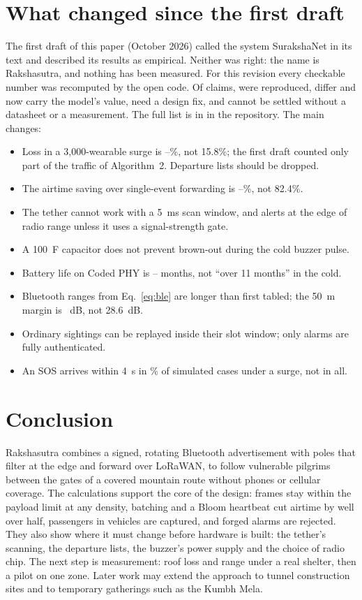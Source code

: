 \documentclass[11pt,a4paper]{article}
\begin{document}
\section{What changed since the first draft}\label{sec:audit}
The first draft of this paper (October 2026) called the system SurakshaNet in its text and described its results as
empirical. Neither was right: the name is Rakshasutra, and nothing has been measured. For this revision every
checkable number was recomputed by the open code. Of \AuditTotal{} claims, \AuditRep{} were reproduced, \AuditDiff{}
differ and now carry the model's value, \AuditFix{} need a design fix, and \AuditOpen{} cannot be settled without a
datasheet or a measurement. The full list is in  in the repository. The main changes:
\begin{itemize}
\item Loss in a 3,000-wearable surge is \LossRakNd--\LossRak\%, not 15.8\%; the first draft counted only part of the
traffic of Algorithm~2. Departure lists should be dropped.
\item The airtime saving over single-event forwarding is \AirRed--\AirRedNd\%, not 82.4\%.
\item The tether cannot work with a 5~ms scan window, and alerts at the edge of radio range unless it uses a
signal-strength gate.
\item A 100~\textmu F capacitor does not prevent brown-out during the cold buzzer pulse.
\item Battery life on Coded PHY is \LifeColdCoded--\LifeWarmCoded{} months, not ``over 11 months'' in the cold.
\item Bluetooth ranges from Eq.~\ref{eq:ble} are longer than first tabled; the 50~m margin is \MarginFifty~dB, not
28.6~dB.
\item Ordinary sightings can be replayed inside their slot window; only alarms are fully authenticated.
\item An SOS arrives within 4~s in \SosFour\% of simulated cases under a surge, not in all.
\end{itemize}

\section{Conclusion}
Rakshasutra combines a signed, rotating Bluetooth advertisement with poles that filter at the edge and forward over
LoRaWAN, to follow vulnerable pilgrims between the gates of a covered mountain route without phones or cellular
coverage. The calculations support the core of the design: frames stay within the payload limit at any density,
batching and a Bloom heartbeat cut airtime by well over half, passengers in vehicles are captured, and forged alarms
are rejected. They also show where it must change before hardware is built: the tether's scanning, the departure
lists, the buzzer's power supply and the choice of radio chip. The next step is measurement: roof loss and range under
a real shelter, then a pilot on one zone. Later work may extend the approach to tunnel construction sites and to
temporary gatherings such as the Kumbh Mela.
\end{document}
